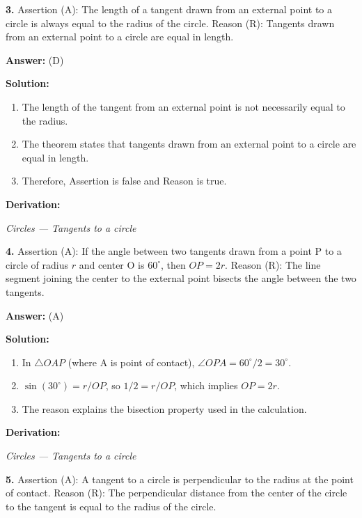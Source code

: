 \documentclass[12pt,a4paper]{exam}
\newcommand{\fitmath}[1]{%
  \sbox{\schmathbox}{$\displaystyle #1$}%
  \ifdim\wd\schmathbox>\linewidth
    \resizebox{\linewidth}{!}{\usebox{\schmathbox}}%
  \else
    \usebox{\schmathbox}%
  \fi}
\begin{document}
\begin{questions}
\question \textbf{3.} Assertion (A): The length of a tangent drawn from an external point to a circle is always equal to the radius of the circle. Reason (R): Tangents drawn from an external point to a circle are equal in length.

\textbf{Answer:}
(D)

\textbf{Solution:}
\begin{enumerate}
  \item The length of the tangent from an external point is not necessarily equal to the radius.
  \item The theorem states that tangents drawn from an external point to a circle are equal in length.
  \item Therefore, Assertion is false and Reason is true.
\end{enumerate}
\textbf{Derivation:}
\begin{center}
\fitmath{A: \text{False}, R: \text{True}}
\end{center}
\hfill \textit{Circles — Tangents to a circle}
\vspace{0.3cm}

\question \textbf{4.} Assertion (A): If the angle between two tangents drawn from a point P to a circle of radius $r$ and center O is $60^\circ$, then $OP = 2r$. Reason (R): The line segment joining the center to the external point bisects the angle between the two tangents.

\textbf{Answer:}
(A)

\textbf{Solution:}
\begin{enumerate}
  \item In $\triangle OAP$ (where A is point of contact), $\angle OPA = 60^\circ/2 = 30^\circ$.
  \item $\sin(30^\circ) = r/OP$, so $1/2 = r/OP$, which implies $OP = 2r$.
  \item The reason explains the bisection property used in the calculation.
\end{enumerate}
\textbf{Derivation:}
\begin{center}
\fitmath{\begin{aligned}
\sin(30^\circ) = \frac{r}{OP} \\
\implies OP = 2r
\end{aligned}}
\end{center}
\hfill \textit{Circles — Tangents to a circle}
\vspace{0.3cm}

\question \textbf{5.} Assertion (A): A tangent to a circle is perpendicular to the radius at the point of contact. Reason (R): The perpendicular distance from the center of the circle to the tangent is equal to the radius of the circle.


\end{questions}
\end{document}
